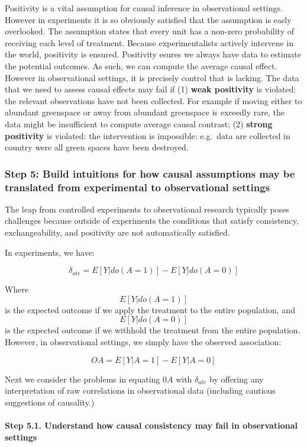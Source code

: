 \documentclass[
  singlecolumn]{article}
\let\oldparagraph\paragraph
\renewcommand{\paragraph}[1]{\oldparagraph{#1}\mbox{}}
\begin{document}
Positivity is a vital assumption for causal inference in observational
settings. However in experiments it is so obviously satisfied that the
assumption is easly overlooked. The assumption states that every unit
has a non-zero probability of receiving each level of treatment. Because
experimentalists actively intervene in the world, positivity is ensured.
Positivity esures we always have data to estimate the potential
outcomes. As such, we can compute the average causal effect. However in
observational settings, it is precisely control that is lacking. The
data that we need to assess causal effects may fail if (1) \textbf{weak
positivity} is violated: the relevant observations have not been
collected. For example if moving either to abundant greenspace or away
from abundant greenspace is exceedly rare, the data might be
insufficient to compute average causal contrast; (2) \textbf{strong
positivity} is violated: the intervention is impossible: e.g.~data are
collected in country were all green spaces have been destroyed.

\subsubsection{Step 5: Build intuitions for how causal assumptions may
be translated from experimental to observational
settings}\label{step-5-build-intuitions-for-how-causal-assumptions-may-be-translated-from-experimental-to-observational-settings}

The leap from controlled experiments to observational research typically
poses challenges because outside of experiments the conditions that
satisfy consistency, exchangeability, and positivity are not
automatically satisfied.

In experiments, we have:

\[
\delta_{ate} = E[Y | do(A = 1)] - E[Y | do(A = 0)]
\]

Where \[E[Y | do(A = 1)]\] is the expected outcome if we apply the
treatment to the entire population, and \[E[Y | do(A = 0)]\] is the
expected outcome if we withhold the treatment from the entire
population. However, in observational settings, we simply have the
observed association:

\[
OA = E[Y | A = 1] - E[Y | A = 0]
\]

Next we consider the problems in equating \(0A\) with \(\delta_{ate}\)
by offering any interpretation of raw correlations in observational data
(including cautious suggestions of causality.)

\paragraph{\texorpdfstring{\textbf{Step 5.1. Understand how causal
consistency may fail in observational
settings}}{Step 5.1. Understand how causal consistency may fail in observational settings}}\label{step-5.1.-understand-how-causal-consistency-may-fail-in-observational-settings}
\end{document}
